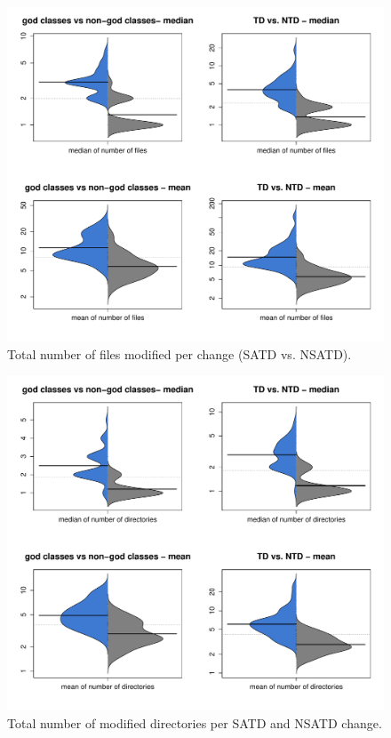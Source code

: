 \begin{figure}[tb!]
	\centering
	\includegraphics[width=120mm]{figures/chapter4/rq3_distribution_of_nf}
	\caption{Total number of files modified per change (SATD vs. NSATD).}
	\label{figure:ch4_tfcpc}
\end{figure}

\begin{figure}[!tb]
	\centering
	\includegraphics[width=120mm]{figures/chapter4/rq3_distribution_of_nd}
	\caption{Total number of modified directories per SATD and NSATD change.}
	\label{figure:ch4_umber_of_directories}
\end{figure}


